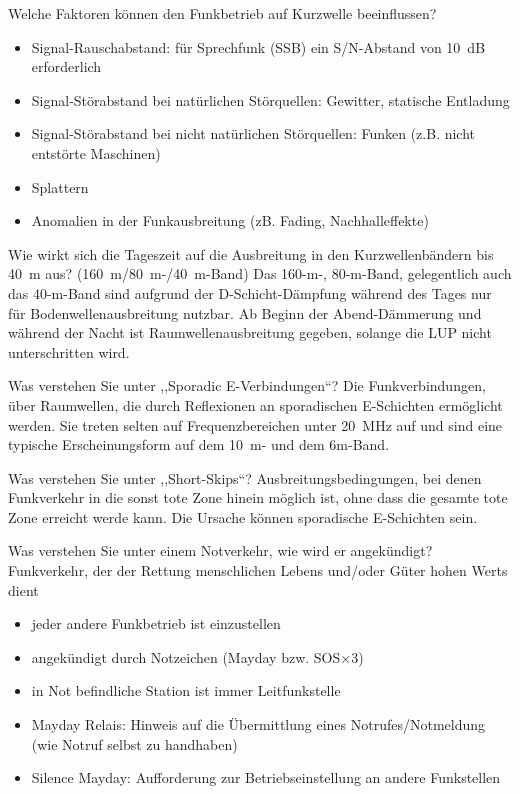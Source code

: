 \documentclass[avery5371,grid,frame,a4paper]{flashcards}
\newcommand{\card}[3]{
  \begin{flashcard}[{\chap} -- #1]{#2}#3\end{flashcard}
}
\begin{document}
\card{29}{Welche Faktoren können den Funkbetrieb auf Kurzwelle beeinflussen?}{
  \small
  \begin{itemize}
    \item Signal-Rauschabstand: für Sprechfunk (SSB) ein S/N-Abstand von \SI{10}{\dB} erforderlich
    \item Signal-Störabstand bei natürlichen Störquellen: Gewitter, statische Entladung
    \item Signal-Störabstand bei nicht natürlichen Störquellen: Funken (z.B. nicht entstörte Maschinen)
    \item Splattern
    \item Anomalien in der Funkausbreitung (zB. Fading, Nachhalleffekte)
  \end{itemize}
}
\card{30}{Wie wirkt sich die Tageszeit auf die Ausbreitung in den Kurzwellenbändern bis \SI{40}{\metre} aus? (\SI{160}{\metre}/\SI{80}{\metre}-/\SI{40}{\metre}-Band)}{
  Das 160-m-, 80-m-Band, gelegentlich auch das 40-m-Band sind aufgrund der D-Schicht-Dämpfung während des Tages nur für Bodenwellenausbreitung nutzbar. Ab Beginn der Abend-Dämmerung und während der Nacht ist Raumwellenausbreitung gegeben, solange die LUP nicht unterschritten wird.
}
\card{31}{Was verstehen Sie unter ,,Sporadic E-Verbindungen``?}{
  Die Funkverbindungen, über Raumwellen, die durch Reflexionen an sporadischen E-Schichten ermöglicht werden. Sie treten selten auf Frequenzbereichen unter \SI{20}{\mega\Hz} auf und sind eine typische Erscheinungsform auf dem \SI{10}{\metre}- und dem 6m-Band.
}
\card{32}{Was verstehen Sie unter ,,Short-Skips``?}{
  Ausbreitungsbedingungen, bei denen Funkverkehr in die sonst tote Zone hinein möglich ist, ohne dass die gesamte tote Zone erreicht werde kann. Die Ursache können sporadische E-Schichten sein.
}
\card{33}{Was verstehen Sie unter einem Notverkehr, wie wird er angekündigt?}{
  \small
  Funkverkehr, der der Rettung menschlichen Lebens und/oder Güter hohen Werts dient
  \begin{itemize}
    \item jeder andere Funkbetrieb ist einzustellen
    \item angekündigt durch Notzeichen {\footnotesize (Mayday bzw. SOS$\times 3$)}
    \item in Not befindliche Station ist immer Leitfunkstelle
    \item Mayday Relais: Hinweis auf die Übermittlung eines Notrufes/Notmeldung (wie Notruf selbst zu handhaben)
    \item Silence Mayday: Aufforderung zur Betriebseinstellung an andere Funkstellen
  \end{itemize}
}
\end{document}
